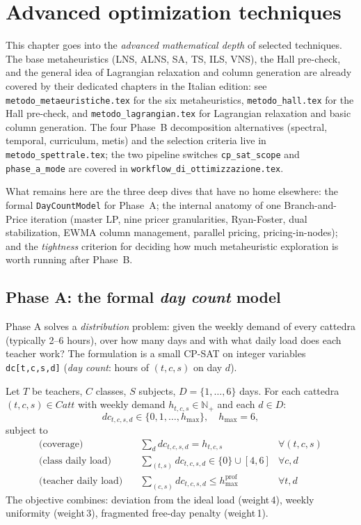 \chapter{Advanced optimization techniques}
\label{ch:tecniche_avanzate_en}

This chapter goes into the \emph{advanced mathematical depth}
of selected techniques. The base metaheuristics (LNS, ALNS, SA,
TS, ILS, VNS), the Hall pre-check, and the general idea of
Lagrangian relaxation and column generation are already covered
by their dedicated chapters in the Italian edition: see
\texttt{metodo\_metaeuristiche.tex} for the six metaheuristics,
\texttt{metodo\_hall.tex} for the Hall pre-check, and
\texttt{metodo\_lagrangian.tex} for Lagrangian relaxation and
basic column generation. The four Phase~B decomposition
alternatives (spectral, temporal, curriculum, metis) and the
selection criteria live in \texttt{metodo\_spettrale.tex}; the
two pipeline switches \texttt{cp\_sat\_scope} and
\texttt{phase\_a\_mode} are covered in
\texttt{workflow\_di\_ottimizzazione.tex}.

What remains here are the three deep dives that have no home
elsewhere: the formal \texttt{DayCountModel} for Phase~A; the
internal anatomy of one Branch-and-Price iteration (master LP,
nine pricer granularities, Ryan-Foster, dual stabilization,
EWMA column management, parallel pricing, pricing-in-nodes); and
the \emph{tightness} criterion for deciding how much
metaheuristic exploration is worth running after Phase~B.

\section{Phase A: the formal \emph{day count} model}
\label{sec:phase-a-formal-en}

Phase A solves a \emph{distribution} problem: given the weekly
demand of every cattedra (typically 2--6 hours), over how many
days and with what daily load does each teacher work? The
formulation is a small CP-SAT on integer variables
\texttt{dc[t,c,s,d]} (\emph{day count}: hours of $(t,c,s)$ on
day $d$).

\begin{defbox}[title={The \texttt{DayCountModel}}]
Let $T$ be teachers, $C$ classes, $S$ subjects,
$D = \{1,\dots,6\}$ days. For each cattedra $(t,c,s) \in
\mathit{Catt}$ with weekly demand $h_{t,c,s} \in \mathbb{N}_+$
and each $d \in D$:
\[
  dc_{t,c,s,d} \in \{0, 1, \dots, h_{\max}\},\quad h_{\max}=6,
\]
subject to
\begin{align}
\text{(coverage)}\quad &\sum_d dc_{t,c,s,d} = h_{t,c,s} & \forall (t,c,s) \\
\text{(class daily load)}\quad &\sum_{(t,s)} dc_{t,c,s,d} \in \{0\}\cup [4,6] & \forall c, d \\
\text{(teacher daily load)}\quad &\sum_{(c,s)} dc_{t,c,s,d} \le h^{\text{prof}}_{\max} & \forall t, d
\end{align}
The objective combines: deviation from the ideal load
(weight\,4), weekly uniformity (weight\,3), fragmented free-day
penalty (weight\,1).
\end{defbox}

